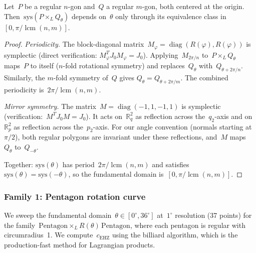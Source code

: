 \begin{lemma}
\label{lem:rotation-fundamental-domain}
Let~$P$ be a regular $n$-gon and~$Q$ a regular $m$-gon, both centered at the
origin. Then~$\mathrm{sys}(P \times_L Q_\theta)$ depends on~$\theta$ only
through its equivalence class in~$[0, \pi/\operatorname{lcm}(n,m)]$.
\end{lemma}

\begin{proof}
\emph{Periodicity.}
The block-diagonal matrix~$M_\varphi = \operatorname{diag}(R(\varphi),
R(\varphi))$ is symplectic (direct verification: $M_\varphi^T J_0 M_\varphi
= J_0$). Applying~$M_{2\pi/n}$ to~$P \times_L Q_\theta$
maps~$P$ to itself ($n$-fold rotational symmetry)
and replaces~$Q_\theta$ with~$Q_{\theta + 2\pi/n}$. Similarly, the $m$-fold symmetry of~$Q$
gives $Q_\theta = Q_{\theta + 2\pi/m}$. The combined periodicity
is~$2\pi/\operatorname{lcm}(n,m)$.

\emph{Mirror symmetry.}
The matrix~$M = \operatorname{diag}(-1, 1, -1, 1)$ is symplectic
(verification:~$M^T J_0 M = J_0$). It acts on~$\mathbb{R}^2_q$ as reflection
across the~$q_2$-axis and on~$\mathbb{R}^2_p$ as reflection across
the~$p_2$-axis. For our angle convention (normals starting at~$\pi/2$), both
regular polygons are invariant under these reflections, and~$M$
maps~$Q_\theta$ to~$Q_{-\theta}$.

Together: $\mathrm{sys}(\theta)$ has period~$2\pi/\operatorname{lcm}(n,m)$ and
satisfies~$\mathrm{sys}(\theta) = \mathrm{sys}(-\theta)$, so the fundamental
domain is~$[0, \pi/\operatorname{lcm}(n,m)]$.
\end{proof}


\subsubsection*{Family 1: Pentagon rotation curve}

We sweep the fundamental domain~$\theta \in [0^\circ, 36^\circ]$ at~$1^\circ$ resolution (37 points)
for the family~$\mathrm{Pentagon} \times_L R(\theta)\,\mathrm{Pentagon}$,
where each pentagon is regular with circumradius~1.
We compute~$c_{\mathrm{EHZ}}$ using the billiard algorithm, which is the production-fast method for Lagrangian
products.

